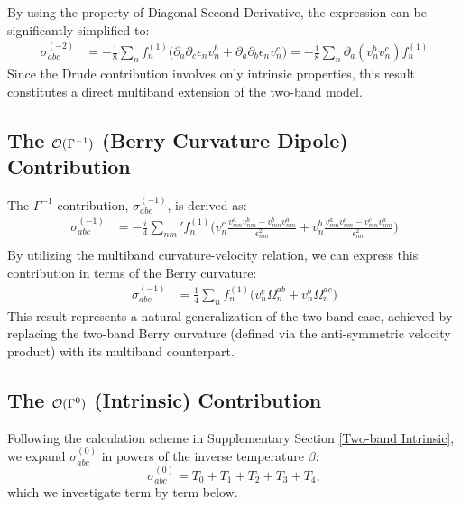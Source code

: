 \documentclass[twocolumn, prx, reprint, amsfonts, amsmath, amssymb, longbibliography, floatfix, aps]{revtex4-2}
\begin{document}
By using the property of Diagonal Second Derivative, the expression can be significantly simplified to:
\begin{equation}
	\begin{aligned}
		\sigma^{(-2)}_{abc}
		&= -\frac{1}{8}
        {\textstyle \sum_{n}}f^{(1)}_n \Big(\partial_a\partial_c\epsilon_n v^b_{n} + \partial_a\partial_b\epsilon_n v^c_{n}\Big)
		= -\frac{1}{8}
        {\textstyle \sum_{n}}\partial_a(v^b_n v^c_n) f^{(1)}_n
	\end{aligned}
\end{equation}
Since the Drude contribution involves only intrinsic properties, this result constitutes a direct multiband extension of the two-band model.

\subsection{The \texorpdfstring{${\cal O}(\Gamma^{-1})$}{O(Gamma-1)} (Berry Curvature Dipole) Contribution}
The $\Gamma^{-1}$ contribution, $\sigma^{(-1)}_{abc}$, is derived as:
\begin{equation}
	\begin{aligned}
		\sigma^{(-1)}_{abc} &= -\frac{i}{4} 
        {\textstyle \sum_{nm}'}
        f^{(1)}_n \Big(v^c_{n}\frac{v^{a}_{mn}v^b_{nm} - v^{b}_{mn}v^a_{nm}}{\epsilon_{nm}^2} + v^b_{n}\frac{v^{a}_{mn}v^c_{nm} - v^{c}_{mn}v^a_{nm}}{\epsilon_{nm}^2} \Big) \\
	\end{aligned}
\end{equation}
By utilizing the multiband curvature-velocity relation, we can express this contribution in terms of the Berry curvature:
\begin{equation}
	\begin{aligned}
		\sigma^{(-1)}_{abc} 
		&= \frac{1}{4} {\textstyle \sum_{n}} f^{(1)}_n \Big(v^c_{n}\Omega^{ab}_n + v^b_{n}\Omega^{ac}_n \Big)
	\end{aligned}
\end{equation}
This result represents a natural generalization of the two-band case, achieved by replacing the two-band Berry curvature (defined via the anti-symmetric velocity product) with its multiband counterpart.

\subsection{The \texorpdfstring{${\cal O}(\Gamma^{0})$}{O(Gamma-0)} (Intrinsic) Contribution}
Following the calculation scheme in Supplementary Section \ref{Two-band Intrinsic}, we expand $\sigma^{(0)}_{abc}$ in powers of the inverse temperature $\beta$: 
\begin{equation}
\sigma^{(0)}_{abc} = T_0 + T_1 + T_2 + T_3 + T_4 ,
\end{equation}
which we investigate term by term below.
\end{document}
